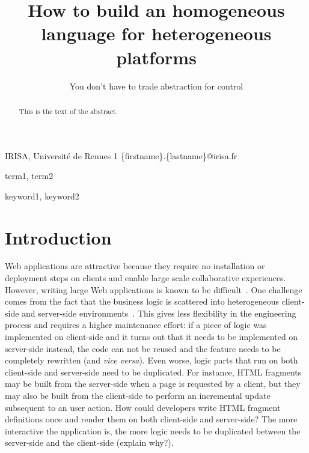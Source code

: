 \documentclass[preprint]{sigplanconf}
\begin{document}
\copyrightdata{[to be supplied]} 


\title{How to build an homogeneous language for heterogeneous platforms}
\subtitle{You don’t have to trade abstraction for control}

           {IRISA, Université de Rennes 1}
           {\{firstname\}.\{lastname\}@irisa.fr}

\maketitle

\begin{abstract}
This is the text of the abstract.
\end{abstract}


\terms
term1, term2

\keywords
keyword1, keyword2

\section{Introduction}

Web applications are attractive because they require no installation or deployment steps on clients and enable large
scale collaborative experiences. However, writing large Web applications is known to be
difficult~\cite{Mikkonen08_SpaghettiJs,Preciado05_RIAMethodologyNecessity}. One challenge comes from the fact
that the business logic is scattered into heterogeneous client-side and server-side
environments~\cite{Echeverria09_RIA,Kuuskeri09_PartitioningClientServer}. This gives less flexibility in the
engineering process and requires a higher maintenance effort: if a piece of logic was implemented on
client-side and it turns out that it needs to be implemented on server-side instead, the code can not be reused and
the feature needs to be completely rewritten (and \emph{vice versa}). Even worse, logic parts that run on both
client-side and server-side need to be duplicated. For instance, HTML fragments may be built from the server-side
when a page is requested by a client, but they may also be built from the client-side to perform an incremental
update subsequent to an user action. How could developers write HTML fragment definitions once and render them on
both client-side and server-side? The more interactive the application is, the more logic needs to be duplicated
between the server-side and the client-side (explain why?).
\end{document}
